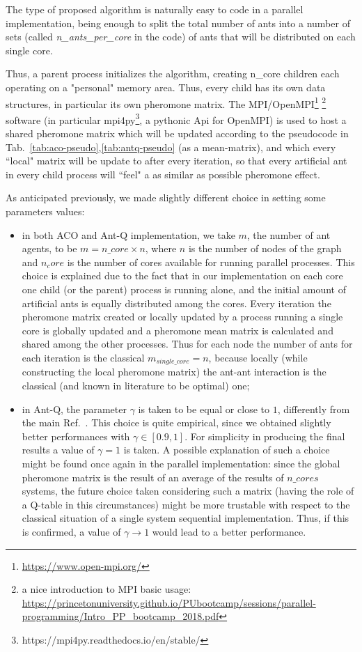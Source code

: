 \documentclass[10pt]{article}
\begin{document}
The type of proposed algorithm is naturally easy to code in a parallel implementation, being enough to split the total number of ants into a number of sets (called \textit{n\_ants\_per\_core} in the code) of ants that will be distributed on each single core.

Thus, a parent process initializes the algorithm, creating n\_core children each operating on a "personal" memory area. 
Thus, every child has its own data structures, in particular its own pheromone matrix. 
The MPI/OpenMPI\footnote{\url{https://www.open-mpi.org/}} \footnote{a nice introduction to MPI basic usage: \url{https://princetonuniversity.github.io/PUbootcamp/sessions/parallel-programming/Intro_PP_bootcamp_2018.pdf}} software (in particular mpi4py\footnote{https://mpi4py.readthedocs.io/en/stable/}, a pythonic Api for OpenMPI) is used to host a shared pheromone matrix which will be updated according to the pseudocode in Tab.~\ref{tab:aco-pseudo},\ref{tab:antq-pseudo} (as a mean-matrix), and which every ``local" matrix will be update to after every iteration, so that every artificial ant in every child process will ``feel" a as similar as possible pheromone effect.

As anticipated previously, we made slightly different choice in setting some parameters values:
\begin{itemize}
\item in both ACO and Ant-Q implementation, we take $m$, the number of ant agents, to be $m=n\_core\times n$, where $n$ is the number of nodes of the graph and $n_core$ is the number of cores available for running parallel processes.
This choice is explained due to the fact that in our implementation on each core one child (or the parent) process is running alone, and the initial amount of artificial ants is equally distributed among the cores. Every iteration the pheromone matrix created or locally updated by a process running a single core is globally updated and a pheromone mean matrix is calculated and shared among the other processes. Thus for each node the number of ants for each iteration is the classical $m_{single\_core}=n$, because locally (while constructing the local pheromone matrix) the ant-ant interaction is the classical (and known in literature to be optimal) one;
\item in Ant-Q, the parameter $\gamma$ is taken to be equal or close to $1$, differently from the main Ref.~\cite{undici}. This choice is quite empirical, since we obtained slightly better performances with $\gamma \in [0.9,1]$. For simplicity in producing the final results a value of $\gamma=1$ is taken. A possible explanation of such a choice might be found once again in the parallel implementation: since the global pheromone matrix is the result of an average of the results of $n\_cores$ systems, the future choice taken considering such a matrix (having the role of a Q-table in this circumstances) might be more trustable with respect to the classical situation of a single system sequential implementation. Thus, if this is confirmed, a value of $\gamma \rightarrow 1$ would lead to a better performance.
\end{itemize}
\end{document}
